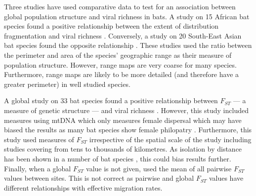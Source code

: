 


Three studies have used comparative data to test for an association between global population structure and viral richness in bats.
A study on 15 African bat species found a positive relationship between the extent of distribution fragmentation and viral richness \cite{maganga2014bat}.
Conversely, a study on 20 South-East Asian bat species found the opposite relationship \cite{gay2014parasite}. 
These studies used the ratio between the perimeter and area of the species' geographic range as their measure of population structure.
However, range maps are very coarse for many species.
Furthermore, range maps are likely to be more detailed (and therefore have a greater perimeter) in well studied species.

A global study on 33 bat species found a positive relationship between $F_{ST}$ --- a measure of genetic structure --- and viral richness \cite{turmelle2009correlates}. 
However, this study included measures using mtDNA which only measures female dispersal which may have biased the results as many bat species show female philopatry \cite{kerth2002extreme, hulva2010mechanisms}.
Furthermore, this study used measures of $F_{ST}$ irrespective of the spatial scale of the study including studies covering from tens \cite{mccracken1981social} to thousands \cite{petit1999male} of kilometres.
As isolation by distance has been shown in a number of bat species \cite{burland1999population, hulva2010mechanisms, o2015genetic, vonhof2015range}, this could bias results further.
Finally, when a global $F_{ST}$ value is not given, \textcite{turmelle2009correlates} used the mean of all pairwise $F_{ST}$ values between sites.
This is not correct as pairwise and global $F_{ST}$ values have different relationships with effective migration rates. 





